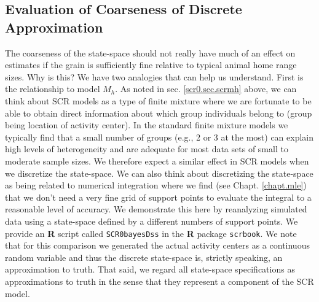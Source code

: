 \subsection{Evaluation of Coarseness of Discrete Approximation}

The coarseness of the state-space should not really have much of an
effect on estimates if the grain is sufficiently fine relative to
typical animal home range sizes.  Why is this?  We have two analogies
that can help us understand. First is the relationship to model
$M_{h}$.  As noted in sec. \ref{scr0.sec.scrmh} above, we can think
about SCR models as a type of finite mixture
\citep{norris_pollock:1996, pledger:2000} where we are fortunate to be
able to obtain direct information about which group individuals belong
to (group being location of activity center).  In the standard finite
mixture models we typically find that a small number of groups (e.g.,
2 or 3 at the most) can explain  high levels of heterogeneity
and are adequate for most data sets of small to moderate sample
sizes. We therefore expect a similar effect in SCR models when we
discretize the state-space.  We can also think about discretizing the
state-space as being related to numerical integration where we find
(see Chapt. \ref{chapt.mle}) that we don't need a very fine grid of
support points to evaluate the integral to a reasonable level of
accuracy. We demonstrate this here by reanalyzing simulated data using
a state-space defined by a different numbers of support points.  We
provide an {\bf R} script called \mbox{\tt SCR0bayesDss} in the
{\bf R} package \mbox{\tt scrbook}.  We note that for this comparison
we generated the actual activity centers as a continuous random
variable and thus the discrete state-space is, strictly speaking, an
approximation to truth. That said, we regard all state-space
specifications as approximations to truth in the sense that they
represent a component of the SCR model. 

